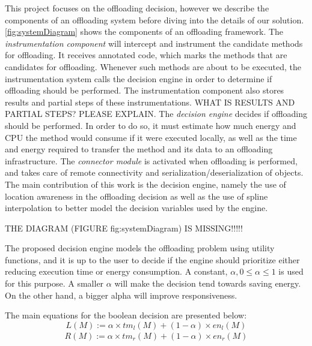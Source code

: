 \documentclass[10pt, conference, letterpaper]{IEEEtran}
\begin{document}
  This project focuses on the offloading decision, however we describe the components of an offloading system before diving into the details of our solution. \ref{fig:systemDiagram} shows the components of an offloading framework. The {\it instrumentation component} will intercept and instrument the candidate methods for offloading. It receives annotated code, which marks the methods that are candidates for offloading. Whenever such methods are about to be executed, the instrumentation system calls the decision engine in order to determine if offloading should be performed. The instrumentation component also stores results and partial steps of these instrumentations. {\color{red} WHAT IS RESULTS AND PARTIAL STEPS? PLEASE EXPLAIN}.  The {\it decision engine} decides if offloading should be performed. In order to do so, it must estimate how much energy and CPU the method would consume if it were executed locally, as well as the time and energy required to transfer the method and its data to an offloading infrastructure.  The {\it connector module} is activated when offloading is performed, and takes care of remote connectivity and serialization/deserialization of objects.  The main contribution of this work is the decision engine, namely the use of location awareness in the offloading decision as well as the use of spline interpolation to better model the decision variables used by the engine.
  
 {\color{red} THE DIAGRAM (FIGURE fig:systemDiagram) IS MISSING!!!!!}

  The proposed decision engine models the offloading problem using utility functions, and it is up to the user to decide if the engine should prioritize either reducing execution time or energy consumption. A constant, $\alpha, 0 \leq \alpha \leq 1$ is used for this purpose. A smaller $\alpha$ will make the decision tend towards saving energy. On the other hand, a bigger alpha will improve responsiveness. 

  The main equations for the boolean decision are presented below:
  \begin{equation} \label{eq:localutility}
    L(M) := \alpha \times tm_{l}(M) + (1-\alpha) \times en_{l}(M) 
  \end{equation}
  \begin{equation} \label{eq:remoteutility}
  \begin{multlined}
    R(M) := \alpha \times tm_{r}(M) + (1-\alpha) \times en_{r}(M) 
  \end{multlined}
  \end{equation}
\end{document}
